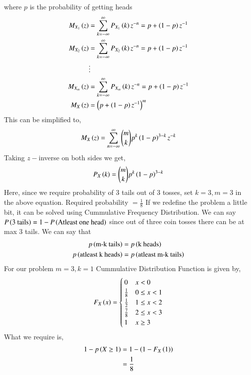 \documentclass[journal]{IEEEtran}
\begin{document}
where $p$ is the probability of getting heads
\begin{align}
  M_{X_1}\left(z\right)&=\sum_{k=-\infty}^{\infty}P_{X_1}\left(k\right)z^{-n} = p + \left(1-p\right)z^{-1}\\
  M_{X_2}\left(z\right)&=\sum_{k=-\infty}^{\infty}P_{X_2}\left(k\right)z^{-n} = p + \left(1-p\right)z^{-1}\\
  &\vdots\\
  M_{X_m}\left(z\right)&=\sum_{k=-\infty}^{\infty}P_{X_m}\left(k\right)z^{-n} = p + \left(1-p\right)z^{-1}\\   M_X\left(z\right) &= \left(p + \left(1-p\right)z^{-1}\right)^{m}
\end{align}
This can be simplified to,
\begin{align}
  M_X\left(z\right) = \sum_{n=-\infty}^{\infty} \binom mkp^{k}\left(1-p\right)^{3-k}z^{-k}
\end{align}
Taking $z-$inverse on both sides we get,
\begin{align}
  P_X\left(k\right) = \binom mk p^{k} \left(1-p\right)^{3-k} 
\end{align}
Here, since we require probability of $3$ tails out of $3$ tosses, set $k=3, m=3$ in the above equation.\newline
Required probability $=\frac{1}{8}$\newline
If we redefine the problem a little bit, it can be solved using Cummulative Frequency Distribution. We can say $P\left(\text{3 tails}\right) = 1 - P\left(\text{Atleast one head}\right)$ since out of three coin tosses there can be at max $3$ tails.\newline
We can say that 
\begin{align}
  p\left(\text{m-k tails}\right) &= p\left(\text{k heads}\right)\\
  p\left(\text{atleast k heads}\right) &= p\left(\text{atleast m-k tails}\right)
\end{align}
For our problem $m=3, k=1$
Cummulative Distribution Function is given by,
\begin{align}
  F_X\left(x\right) = \begin{cases}
    0 & x < 0\\
    \frac{1}{8} & 0 \le x < 1\\
    \frac{1}{2} & 1 \le x < 2\\
    \frac{7}{8} & 2 \le x < 3\\
    1 & x \ge 3
  \end{cases}
\end{align}
What we require is,
\begin{align}
  1 - p\left(X \ge 1\right) &= 1 - \left(1 - F_X\left(1\right)\right)\\
   &= \frac{1}{8}
\end{align}
\end{document}
